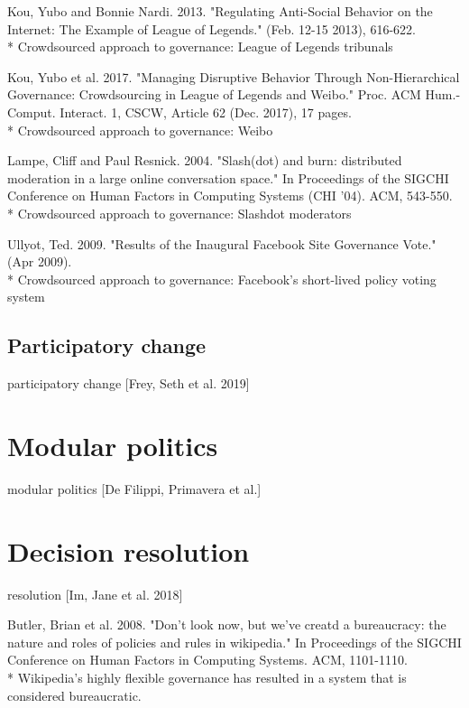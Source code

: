 \documentclass[class=book, crop=false]{standalone}
\begin{document}
Kou, Yubo and Bonnie Nardi. 2013. "Regulating Anti-Social Behavior on the Internet: The Example of League of Legends." (Feb. 12-15 2013), 616-622.\\
 * Crowdsourced approach to governance: League of Legends tribunals
 
Kou, Yubo et al. 2017. "Managing Disruptive Behavior Through Non-Hierarchical Governance: Crowdsourcing in League of Legends and Weibo." Proc. ACM Hum.-Comput. Interact. 1, CSCW, Article 62 (Dec. 2017), 17 pages.\\
 * Crowdsourced approach to governance: Weibo

Lampe, Cliff and Paul Resnick. 2004. "Slash(dot) and burn: distributed moderation in a large online conversation space." In Proceedings of the SIGCHI Conference on Human Factors in Computing Systems (CHI '04). ACM, 543-550.\\
 * Crowdsourced approach to governance: Slashdot moderators

Ullyot, Ted. 2009. "Results of the Inaugural Facebook Site Governance Vote." (Apr 2009).\\
 * Crowdsourced approach to governance: Facebook's short-lived policy voting system

\subsection{Participatory change}

participatory change [Frey, Seth et al. 2019]

\section{Modular politics}

modular politics [De Filippi, Primavera et al.]

\section{Decision resolution}

resolution [Im, Jane et al. 2018]

Butler, Brian et al. 2008. "Don't look now, but we've creatd a bureaucracy: the nature and roles of policies and rules in wikipedia." In Proceedings of the SIGCHI Conference on Human Factors in Computing Systems. ACM, 1101-1110.\\
 * Wikipedia's highly flexible governance has resulted in a system that is considered bureaucratic.
\end{document}
